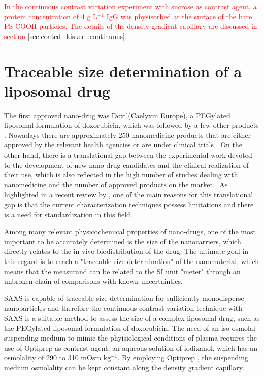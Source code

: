 \textcolor{red}{In the continuous contrast variation experiment with sucrose as contrast agent, a protein concentration of 4 g L$^{-1}$ IgG was physisorbed at the surface of the bare PS-COOH particles. The details of the density gradient capillary are discussed in section \ref{sec:coated_kisker_continuous}.}


\section{Traceable size determination of a liposomal drug}
\label{sec:caelyx_size}

The first approved nano-drug was Doxil\textregistered (Caelyx\textregistered in Europe), a PEGylated liposomal formulation of doxorubicin, which was followed by a few other products \citep{yeh_clinical_2011,barenholz_doxil_2012}. Nowadays there are approximately 250 nanomedicine products that are either approved by the relevant health agencies or are under clinical trials \citep{etheridge_big_2013}. On the other hand, there is a translational gap between the experimental work devoted to the development of new nano-drug candidates and the clinical realization of their use, which is also reflected in the high number of studies dealing with nanomedicine and the number of approved products on the market \citep{khorasani_closing_2014, venditto_cancer_2013}. As highlighted in a recent review by \cite{khorasani_closing_2014}, one of the main reasons for this translational gap is that the current characterization techniques possess limitations and there is a need for standardization in this field.

Among many relevant physicochemical properties of nano-drugs, one of the most important to be accurately determined is the size of the nanocarriers, which directly relates to the in vivo biodistribution of the drug. The ultimate goal in this regard is to reach a "traceable size determination" of the nanomaterial, which means that the measurand can be related to the SI unit "meter" through an unbroken chain of comparisons with known uncertainties. 

SAXS is capable of traceable size determination for sufficiently monodisperse nanoparticles \citep{meli_traceable_2012} and therefore the continuous contrast variation technique with SAXS is a suitable method to assess the size of a complex liposomal drug, such as the PEGylated liposomal formulation of doxorubicin. The need of an iso-osmolal suspending medium to mimic the phyisiological conditions of plasma requires the use of Optiprep \textregistered as contrast agent, an aqueous solution of iodixanol, which has an osmolality of 290 to 310 mOsm kg$^{-1}$. By employing Optiprep \textregistered, the suspending medium osmolality can be kept constant along the density gradient capillary.
 
